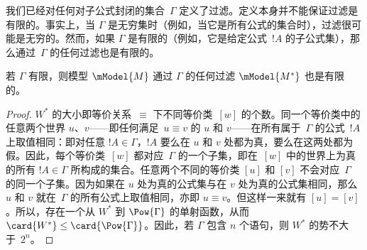\documentclass[../../../include/open-logic-section]{subfiles}
\begin{document}


我们已经对任何对子公式封闭的集合~$\Gamma$ 定义了过滤。定义本身并不能保证过滤是有限的。事实上，当 $\Gamma$ 是无穷集时（例如，当它是所有公式的集合时），过滤很可能是无穷的。然而，如果 $\Gamma$ 是有限的（例如，它是给定公式~$!A$ 的子公式集），那么通过~$\Gamma$ 的任何过滤也是有限的。

\begin{prop}
  若 $\Gamma$ 有限，则模型 $\mModel{M}$ 通过 $\Gamma$ 的任何过滤 $\mModel{M^*}$ 也是有限的。
\end{prop}

\begin{proof}
  $W^*$ 的大小即等价关系~$\equiv$ 下不同等价类~$[w]$ 的个数。同一个等价类中的任意两个世界 $u$、$v$——即任何满足~$u \equiv v$ 的 $u$ 和 $v$——在所有属于~$\Gamma$ 的公式~$!A$ 上取值相同：即对任意 $!A \in \Gamma$，$!A$ 要么在 $u$ 和 $v$ 处都为真，要么在这两处都为假。因此，每个等价类~$[w]$ 都对应~$\Gamma$ 的一个子集，即在~$[w]$ 中的世界上为真的所有 $!A \in \Gamma$ 所构成的集合。任意两个不同的等价类 $[u]$ 和 $[v]$ 不会对应~$\Gamma$ 的同一个子集。因为如果在 $u$ 处为真的公式集与在 $v$ 处为真的公式集相同，那么 $u$ 和 $v$ 就在~$\Gamma$ 的所有公式上取值相同，亦即 $u \equiv v$。但这样一来就有 $[u] = [v]$。所以，存在一个从 $W^*$ 到 $\Pow{\Gamma}$ 的单射函数，从而 $\card{W^*} \le \card{\Pow{\Gamma}}$。因此，若 $\Gamma$ 包含 $n$ 个语句，则 $W^*$ 的势不大于~$2^n$。
\end{proof}
\end{document}
